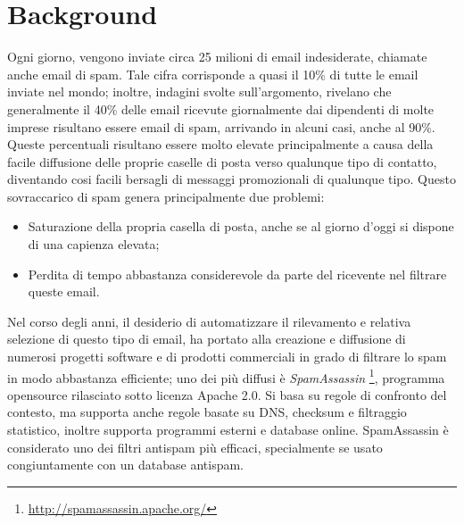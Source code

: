\section{Background}\label{Background}
Ogni giorno, vengono inviate circa 25 milioni di email indesiderate, chiamate anche email di spam. Tale cifra corrisponde a quasi il 10\% di tutte le email inviate nel mondo; inoltre, indagini svolte sull'argomento, rivelano che generalmente il 40\% delle email ricevute giornalmente dai dipendenti di molte imprese risultano essere email di spam, arrivando in alcuni casi, anche al 90\%.
Queste percentuali risultano essere molto elevate principalmente a causa della facile diffusione delle proprie caselle di posta verso qualunque tipo di contatto, diventando cosi facili bersagli di messaggi promozionali di qualunque tipo. Questo sovraccarico di spam genera principalmente due problemi:
\begin{itemize}
\item Saturazione della propria casella di posta, anche se al giorno d'oggi si dispone di una capienza elevata;
\item Perdita di tempo abbastanza considerevole da parte del ricevente nel filtrare queste email.
\end{itemize}
Nel corso degli anni, il desiderio di automatizzare il rilevamento e relativa selezione di questo tipo di email, ha portato alla creazione e diffusione di numerosi progetti software e di prodotti commerciali in grado di filtrare lo spam in modo abbastanza efficiente; uno dei più diffusi è \textit{SpamAssassin} \footnote{\url{http://spamassassin.apache.org/}}, programma opensource rilasciato sotto licenza Apache 2.0. Si basa su regole di confronto del contesto, ma supporta anche regole basate su DNS, checksum e filtraggio statistico, inoltre supporta programmi esterni e database online.
SpamAssassin è considerato uno dei filtri antispam più efficaci, specialmente se usato congiuntamente con un database antispam.\cite{wiki:SpamAssassin}


